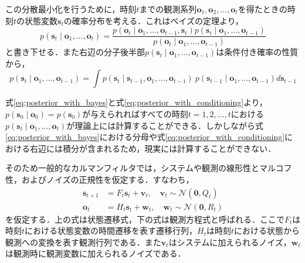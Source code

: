         この分散最小化を行うために，時刻$t$までの観測系列$\bm{o}_1, \bm{o}_2, \dots, \bm{o}_t$を得たときの時刻$t$の状態変数$\bm{s}_t$の確率分布を考える．これはベイズの定理より，
        \begin{equation}
            \label{eq:posterior_with_bayes}
            p(\bm{s}_t \mid \bm{o}_1,\dots, \bm{o}_t ) = \frac{p(\bm{o}_t \mid \bm{o}_1,\dots, \bm{o}_{t-1}, \bm{s}_t) p(\bm{s}_t \mid \bm{o}_1,\dots, \bm{o}_{t-1})}{p(\bm{o}_t \mid \bm{o}_1,\dots, \bm{o}_{t-1})}
        \end{equation}
        と書き下せる．また右辺の分子後半部$p(\bm{s}_t \mid \bm{o}_1,\dots, \bm{o}_{t-1})$は条件付き確率の性質から，
        \begin{equation}
            \label{eq:posterior_with_conditioning}
            p(\bm{s}_t \mid \bm{o}_1,\dots, \bm{o}_{t-1}) = \int p(\bm{s}_t \mid \bm{s}_{t-1}, \bm{o}_1, \dots, \bm{o}_{t-1}) ~ p(\bm{s}_{t-1} \mid \bm{o}_1, \dots, \bm{o}_{t-1}) d\bm{s}_{t-1}
        \end{equation}

        式\ref{eq:posterior_with_bayes}と式\ref{eq:posterior_with_conditioning}より，$p(\bm{s}_0 \mid \bm{o}_0) = p(\bm{s}_0)$が与えられればすべての時刻$t = 1, 2, \dots, t$における$p(\bm{s}_t \mid \bm{o}_1,\dots, \bm{o}_t)$が理論上には計算することができる．しかしながら式\ref{eq:posterior_with_bayes}における分母や式\ref{eq:posterior_with_conditioning}における右辺には積分が含まれるため，現実には計算することができない．

        そのため一般的なカルマンフィルタでは，システムや観測の線形性とマルコフ性，およびノイズの正規性を仮定する．すなわち，
        \begin{equation}
            \label{eq:kalman_GL}
            \begin{aligned}
                \bm{s}_{t+1} &= F_t \bm{s}_t + \bm{v}_t, \quad \bm{v}_t \sim \mathcal{N}(\bm{0}, Q_t)
                \\ \bm{o}_t &= H_t \bm{s}_t + \bm{w}_t, \quad \bm{w}_t \sim \mathcal{N}(\bm{0}, R_t)
            \end{aligned}        
        \end{equation}
        を仮定する．上の式は状態遷移式，下の式は観測方程式と呼ばれる．ここで$F_t$は時刻$t$における状態変数の時間遷移を表す遷移行列，$H_t$は時刻$t$における状態から観測への変換を表す観測行列である．また$\bm{v}_t$はシステムに加えられるノイズ，$\bm{w}_t$は観測時に観測変数に加えられるノイズである．

